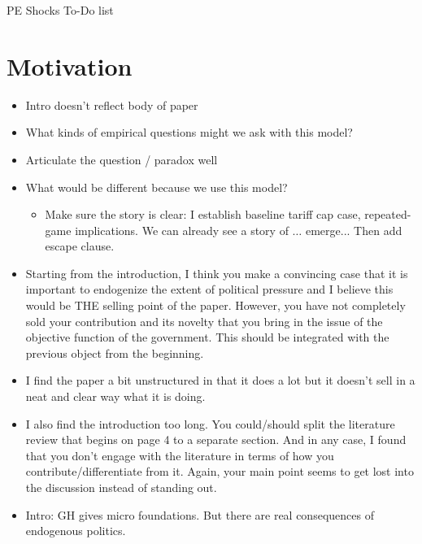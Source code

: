 \documentclass[12pt]{article}
\begin{document}
\begin{center}
PE Shocks To-Do list
\end{center}


\section{Motivation}
		\begin{itemize}
			\item Intro doesn't reflect body of paper
			\item What kinds of empirical questions might we ask with this model?
			\item Articulate the question / paradox well
			\item What would be different because we use this model?
				\begin{itemize}
					\item Make sure the story is clear: I establish baseline tariff cap case, repeated-game implications. We can already see a story of $\ldots$ emerge... Then add escape clause.
				\end{itemize}
			\item Starting from the introduction, I think you make a convincing case that it is important to endogenize the extent of political pressure and I believe this would be THE selling point of the paper. However, you have not completely sold your contribution and its novelty that you bring in the issue of the objective function of the government. This should be integrated with the previous object from the beginning.
			\item I find the paper a bit unstructured in that it does a lot but it doesn't sell in a neat and clear way what it is doing.
			\item I also find the introduction too long. You could/should split the literature review that begins on page 4 to a separate section. And in any case, I found that you don't engage with the literature in terms of how you contribute/differentiate from it. Again, your main point seems to get lost into the discussion instead of standing out.
			\item Intro: GH gives micro foundations. But there are real consequences of endogenous politics.
		\end{itemize}
		
\end{document}
